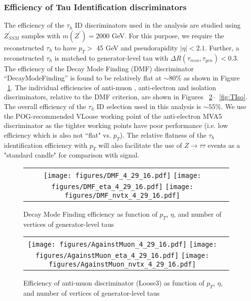\subsubsection{Efficiency of Tau Identification discriminators} \label{sec:tauIDeff}
The efficiency of the $\tau_{h}$ ID discriminators used in the analysis are studied using $Z^{\prime}_{SSM}$ samples with $m(Z^{\prime}) = 2000$ GeV. For this purpose, we require the reconstructed $\tau_{h}$ to have $p_{T} >$ 45 GeV and pseudorapidity $|\eta| < 2.1$. Further, a reconstructed $\tau_{h}$ is matched to generator-level tau with $\Delta R(\tau_{reco},\tau_{gen}) < 0.3$. The efficiency of the Decay Mode Finding (DMF) discriminator  ``DecayModeFinding'' is found to be relatively flat at $\sim 80$\% as shown in Figure ~\ref{fig:DMF}. The individual efficiencies of anti-muon , anti-electron and isolation discriminators, relative to the DMF criterion, are shown in Figures ~\ref{fig:ML3}--~\ref{fig:TIso}. The overall efficiency of the $\tau_{h}$ ID selection used in this analysis is $\sim 55$\%. We use the POG-recommended VLoose working point of the anti-electron MVA5 discriminator as the tighter working points have poor performance (i.e. low efficiency which is also not ``flat" vs. $p_{T}$). The relative flatness of the $\tau_{h}$ identification efficiency with $p_{T}$ will also facilitate the use of $Z\rightarrow\tau\tau$ events as a "standard candle" for comparison with signal. 

\begin{figure}[tbh!]
    \centering
    \begin{tabular}{cc}
      \texttt{[image: figures/DMF\_4\_29\_16.pdf]}
      \texttt{[image: figures/DMF\_eta\_4\_29\_16.pdf]}
       \texttt{[image: figures/DMF\_nvtx\_4\_29\_16.pdf]}
    \end{tabular}
    \caption{Decay Mode Finding efficiency as function of $p_{T}$, $\eta$, and number of vertices of generator-level taus }
    \label{fig:DMF}
  \end{figure}
 
\begin{figure}[tbh!]
    \centering
    \begin{tabular}{cc}
      \texttt{[image: figures/AgainstMuon\_4\_29\_16.pdf]}
      \texttt{[image: figures/AgainstMuon\_eta\_4\_29\_16.pdf]}
       \texttt{[image: figures/AgainstMuon\_nvtx\_4\_29\_16.pdf]}
    \end{tabular}
    \caption{Efficiency of anti-muon discriminator (Loose3) as function of $p_{T}$, $\eta$, and number of vertices of generator-level taus }
    \label{fig:ML3}
  \end{figure}


